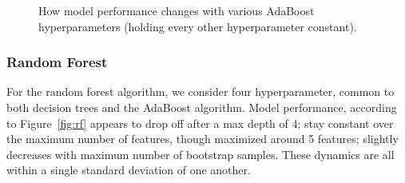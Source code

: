 \documentclass[12pt]{article}
\newtheorem{Proof of Lemma}{Proof of Lemma}
\begin{document}
\begin{figure}[h!]
  \centering
  \caption{How model performance changes with various AdaBoost hyperparameters (holding every other hyperparameter constant).}
  \label{fig:adaboost}
\end{figure}

\subsubsection{Random Forest}
For the random forest algorithm, we consider four hyperparameter, common to both decision trees and the AdaBoost algorithm. 
Model performance, according to Figure~\ref{fig:rf} appears to drop off after a max depth of 4; stay constant over the maximum number of features,
though maximized around 5 features; slightly decreases with maximum number of bootstrap samples. These dynamics are all within a single 
standard deviation of one another. 
\end{document}
